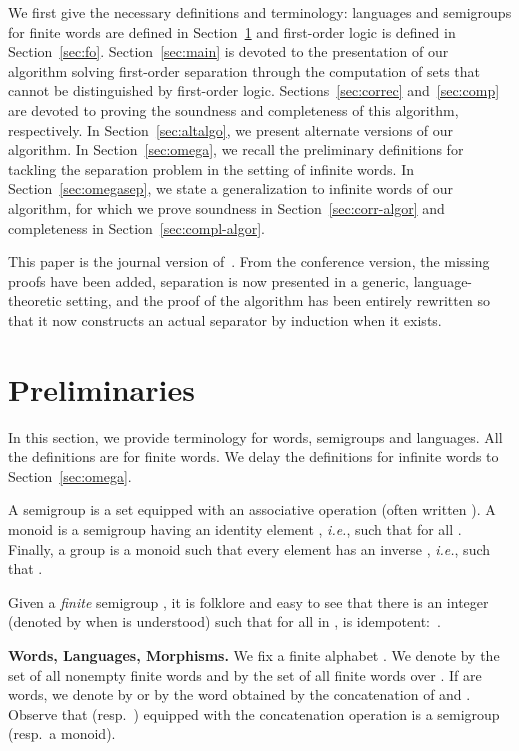 \documentclass{CSML}
\theoremstyle{plain}
\begin{document}
\medskip{}  We first give the necessary
definitions and terminology: languages and semigroups for finite words are
defined in Section~\ref{sec:prelims} and first-order logic is defined in
Section~\ref{sec:fo}. Section~\ref{sec:main} is devoted to the presentation of
our algorithm solving first-order separation through the computation of sets
that cannot be distinguished by first-order logic. Sections~\ref{sec:correc}
and~\ref{sec:comp} are devoted to proving the soundness and completeness of
this algorithm, respectively. In Section~\ref{sec:altalgo}, we present
alternate versions of our algorithm. In Section~\ref{sec:omega}, we recall the
preliminary definitions for tackling the separation problem in the setting of
infinite words. In Section~\ref{sec:omegasep}, we state a
generalization to infinite words of our algorithm, for which we prove
soundness in Section~\ref{sec:corr-algor} and completeness in
Section~\ref{sec:compl-algor}.

\medskip
This paper is the journal version of~\cite{PZ:lics14}. From the
conference version, the missing proofs have been added, separation is now
presented in a generic, language-theoretic setting, and the proof
of the algorithm has been entirely rewritten so that it now
constructs an actual separator by induction when it exists.

\section{Preliminaries}
\label{sec:prelims}
\newcommand\one{\textup{1}}

In this section, we provide terminology for words, semigroups and
languages. All the definitions are for finite words. We
delay the definitions for infinite words to Section~\ref{sec:omega}.

\medskip
{} A semigroup is a set  equipped
with an associative operation  (often written ). A
monoid is a semigroup  having an identity element ,
\emph{i.e.}, such that  for all .
Finally, a group is a monoid such that every element  has an
inverse , \emph{i.e.}, such that .

Given a \emph{finite} semigroup , it is folklore and easy to see that
there is an integer  (denoted by  when  is
understood) such that for all  in ,
 is idempotent:~.

\medskip
\noindent
{\textbf{Words, Languages, Morphisms.}} We fix a finite alphabet
. We denote by  the set of all nonempty finite
words and by  the set of all finite words over . If  are words, we
denote by  or by  the word obtained by the concatenation of  and
. Observe that  (resp.\ ) equipped with the
concatenation operation is a semigroup (resp.\ a monoid).
\end{document}
